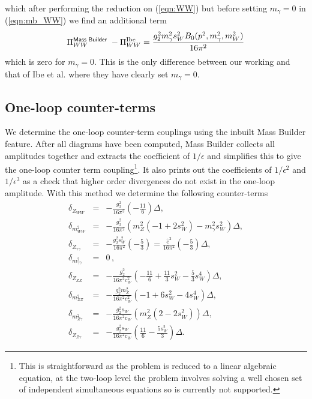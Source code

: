 \documentclass[11pt]{article}
\newcommand{\mb}{\textsf{Mass Builder} }
\begin{document}
which after performing the reduction on (\ref{eqn:WW}) but before setting $m_{\gamma}=0$ in (\ref{eqn:mb_WW}) we find an additional term
\begin{align}
\Pi_{WW}^{\text{\mb}}  - \Pi_{WW}^{\text{Ibe}}  =\frac{g_2^2 m_{\gamma}^2 s_W^2 B_0(p^2,m_{\gamma}^2,m_W^2)}{16 \pi^2}
\end{align}
which is zero for $m_{\gamma}=0$.  This is the only difference between our working and that of Ibe et al. \cite{Ibe2013a} where they have clearly set $m_{\gamma}=0$.



\subsection{One-loop counter-terms}\label{sec:ew_ct}

We determine the one-loop counter-term couplings using the inbuilt \mb feature.  After all diagrams have been computed, \mb collects all amplitudes together and extracts the coefficient of $1/\epsilon$ and simplifies this to give the one-loop counter term coupling\footnote{This is straightforward as the problem is reduced to a linear algebraic equation, at the two-loop level the problem involves solving a well chosen set of independent simultaneous equations so is currently not supported.}.  It also prints out the coefficients of $1/\epsilon^2$ and $1/\epsilon^3$ as a check that higher order divergences do not exist in the one-loop amplitude.  With this method we determine the following counter-terms
\begin{eqnarray}
\delta_{Z_{WW}} &=&- \frac{g_2^2}{16 \pi^2}\left(-\frac{11}{6}\right)\Delta,\\
\delta_{m^2_{WW}}&=&- \frac{g_2^2}{16 \pi^2} \left( m^2_Z(-1+2s_W^2)     -m_{\gamma}^2s_W^2\right)\Delta,\\
\delta_{Z_{\gamma\gamma}} &=&-\frac{g_2^2s_W^2}{16 \pi^2}\left(-\frac{5}{3}\right) = \frac{\hat{e}^2}{16\pi^2}\left(-\frac{5}{3}\right)\Delta , \\
\delta_{m^2_{\gamma\gamma}} &=& 0\, ,\\
\delta_{Z_{ZZ}} &=&-\frac{g_2^2}{16 \pi^2 c_W^2} \left(-\frac{11}{6}+\frac{11}{3}s_W^2-\frac{5}{3}s_W^4  \right)\Delta,\\
\delta_{m^2_{ZZ}} &=& -\frac{g_2^2m_Z^2}{16 \pi^2c_W^2} \left(-1+6s_W^2-4s_W^4  \right)\Delta,\\
\delta_{m^2_{Z\gamma}} &=& -\frac{g_2^2s_W}{16 \pi^2c_W} \left( m_Z^2(2-2s_W^2)  \right)\Delta,\\
\delta_{Z_{Z\gamma}} &=& -\frac{g_2^2s_W}{16 \pi^2c_W} \left( \frac{11}{6}-\frac{5s_W^2}{3}  \right)\Delta.
\end{eqnarray}
\end{document}
